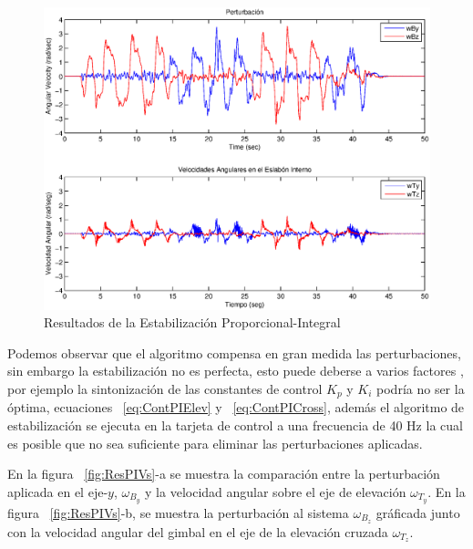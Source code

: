 \begin{figure}[H]
\centering \includegraphics[scale=0.63,trim = 20mm 0mm 20mm 0mm]{img/ResPIPer.eps}
      \caption{Resultados de la Estabilizaci\'{o}n Proporcional-Integral}
      \label{fig:ResPIPer}
\end{figure}

Podemos observar que el algoritmo compensa en gran medida las perturbaciones, sin embargo la estabilizaci\'{o}n no es perfecta, esto puede deberse a varios factores , por ejemplo la sintonizaci\'{o}n de las constantes de control $K_p$ y $K_i$ podr\'{i}a no ser la \'{o}ptima, ecuaciones ~\ref{eq:ContPIElev} y ~\ref{eq:ContPICross}, adem\'{a}s el algoritmo de estabilizaci\'{o}n se ejecuta en la tarjeta de control a una frecuencia de 40 Hz la cual es posible que no sea suficiente para eliminar las perturbaciones aplicadas.  

En la figura ~\ref{fig:ResPIVs}-a se muestra la comparaci\'{o}n entre la perturbaci\'{o}n aplicada en el eje-$y$, $\omega_{B_y}$ y la velocidad angular sobre el eje de elevaci\'{o}n $\omega_{T_y}$. En la figura ~\ref{fig:ResPIVs}-b, se muestra la perturbaci\'{o}n al sistema $\omega_{B_z}$ gr\'{a}ficada junto con la velocidad angular del gimbal en el eje de la elevaci\'{o}n cruzada $\omega_{T_z}$. 

